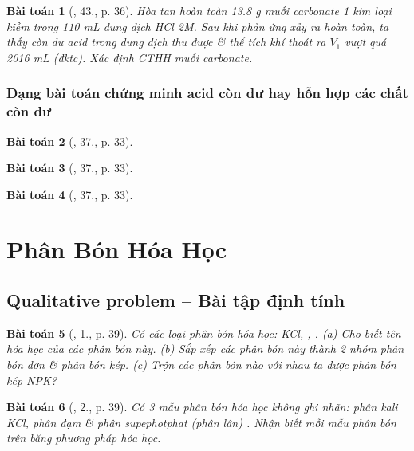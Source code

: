 \documentclass{article}
\newtheorem{baitoan}{Bài toán}
\begin{document}
\begin{baitoan}[\cite{An_350_BT_Hoa_Hoc_9}, 43., p. 36]
	Hòa tan hoàn toàn \emph{13.8 g} muối carbonate 1 kim loại kiềm \emph{} trong \emph{110 mL} dung dịch \emph{HCl 2M}. Sau khi phản ứng xảy ra hoàn toàn, ta thấy còn dư acid trong dung dịch thu được \& thể tích khí thoát ra $V_1$ vượt quá \emph{2016 mL} (đktc). Xác định CTHH muối carbonate.
\end{baitoan}

\subsubsection{Dạng bài toán chứng minh acid còn dư hay hỗn hợp các chất còn dư}

\begin{baitoan}[\cite{An_350_BT_Hoa_Hoc_9}, 37., p. 33]
	
\end{baitoan}

\begin{baitoan}[\cite{An_350_BT_Hoa_Hoc_9}, 37., p. 33]
	
\end{baitoan}

\begin{baitoan}[\cite{An_350_BT_Hoa_Hoc_9}, 37., p. 33]
	
\end{baitoan}


\section{Phân Bón Hóa Học}

\subsection{Qualitative problem -- Bài tập định tính}

\begin{baitoan}[\cite{SGK_Hoa_Hoc_9}, 1., p. 39]
	Có các loại phân bón hóa học: \emph{KCl, , }. (a) Cho biết tên hóa học của các phân bón này. (b) Sắp xếp các phân bón này thành 2 nhóm phân bón đơn \& phân bón kép. (c) Trộn các phân bón nào với nhau ta được phân bón kép NPK?
\end{baitoan}

\begin{baitoan}[\cite{SGK_Hoa_Hoc_9}, 2., p. 39]
	Có 3 mẫu phân bón hóa học không ghi nhãn: phân kali \emph{KCl}, phân đạm \emph{} \& phân supephotphat (phân lân) \emph{}. Nhận biết mỗi mẫu phân bón trên băng phương pháp hóa học.
\end{baitoan}
\end{document}
